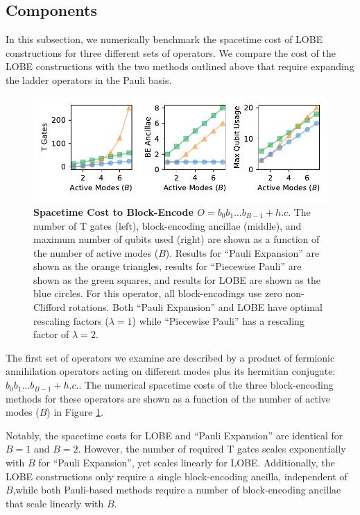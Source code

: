 
\subsection{Components}

In this subsection, we numerically benchmark the spacetime cost of LOBE constructions for three different sets of operators.
We compare the cost of the LOBE constructions with the two methods outlined above that require expanding the ladder operators in the Pauli basis.

\begin{figure}
    \centering
    \includegraphics[width=14cm]{figures/fermionic-hc-comparison.pdf}
    \caption{
        \textbf{Spacetime Cost to Block-Encode $O = b_0 b_1 \hdots b_{B-1} + h.c.$}
        The number of T gates (left), block-encoding ancillae (middle), and maximum number of qubits used (right) are shown as a function of the number of active modes ($B$).
        Results for ``Pauli Expansion'' are shown as the orange triangles, results for ``Piecewise Pauli'' are shown as the green squares, and results for LOBE are shown as the blue circles.
        For this operator, all block-encodings use zero non-Clifford rotations.
        Both ``Pauli Expansion'' and LOBE have optimal rescaling factors ($\lambda = 1$) while ``Piecewise Pauli'' has a rescaling factor of $\lambda = 2$.
    }
    \label{fig:fermionic-hc-comparison}
\end{figure}

The first set of operators we examine are described by a product of fermionic annihilation operators acting on different modes plus its hermitian conjugate: $b_0 b_1 \hdots b_{B-1} + h.c.$.
The numerical spacetime costs of the three block-encoding methods for these operators are shown as a function of the number of active modes ($B$) in Figure \ref{fig:fermionic-hc-comparison}.

Notably, the spacetime costs for LOBE and ``Pauli Expansion'' are identical for $B = 1$ and $B = 2$.
However, the number of required T gates scales exponentially with $B$ for ``Pauli Expansion'', yet scales linearly for LOBE.
Additionally, the LOBE constructions only require a single block-encoding ancilla, independent of $B$,while both Pauli-based methods require a number of block-encoding ancillae that scale linearly with $B$.

